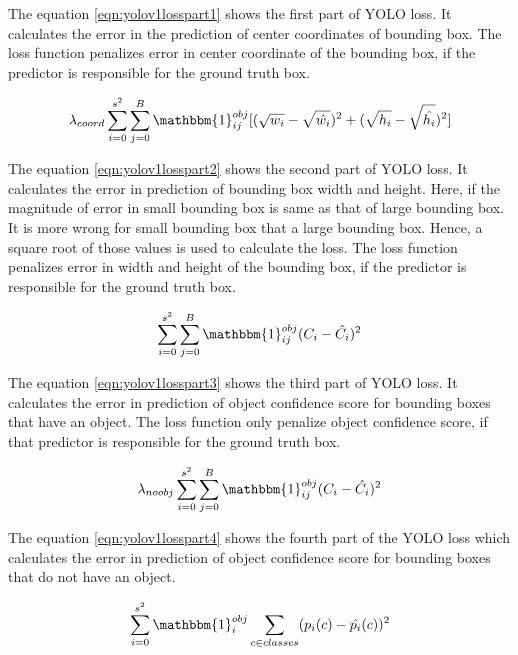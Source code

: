                 The equation \ref{eqn:yolov1losspart1} shows the first part of YOLO loss. It calculates the error in the prediction of center coordinates of bounding box. The loss function penalizes error in center coordinate of the bounding box, if the predictor is responsible for the ground truth box.

                \begin{equation}
                    \label{eqn:yolov1losspart2}
                    \lambda_{coord} \sum_{i=0}^{s^2} \sum_{j=0}^{B} \mathbbm{1}_{i j}^{obj} [(\sqrt{w_i}-\sqrt{\hat{w_i}})^2 + (\sqrt{h_i} - \sqrt{\hat{h_i}})^2]
                \end{equation}

                The equation \ref{eqn:yolov1losspart2} shows the second part of YOLO loss. It calculates the error in prediction of bounding box width and height. Here, if the magnitude of error in small bounding box is same as that of large bounding box. It is more wrong for small bounding box that a large bounding box. Hence, a square root of those values is used to calculate the loss. The loss function penalizes error in width and height of the bounding box, if the predictor is responsible for the ground truth box.


                \begin{equation}
                    \label{eqn:yolov1losspart3}
                    \sum_{i=0}^{s^2} \sum_{j=0}^{B} \mathbbm{1}_{i j}^{obj} (C_i-\hat{C_i})^2
                \end{equation}

                The equation \ref{eqn:yolov1losspart3} shows the third part of YOLO loss. It calculates the error in prediction of object confidence score for bounding boxes that have an object. The loss function only penalize object confidence score, if that predictor is responsible for the ground truth box. 

                \begin{equation}
                    \label{eqn:yolov1losspart4}
                    \lambda_{noobj}  \sum_{i=0}^{s^2} \sum_{j=0}^{B} \mathbbm{1}_{i j}^{obj} (C_i-\hat{C_i})^2
                \end{equation}

                The equation \ref{eqn:yolov1losspart4} shows the fourth part of the YOLO loss which calculates the error in prediction of object confidence score for bounding boxes that do not have an object.

                \begin{equation}
                    \label{eqn:yolov1losspart5}
                    \sum_{i=0}^{s^2} \mathbbm{1}_{i}^{obj} \sum_{c \in classes } (p_i(c)-\hat{p_i}(c))^2
                \end{equation}

